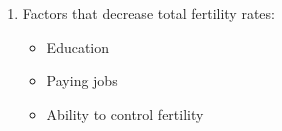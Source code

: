 \documentclass[12pt]{article}
\begin{document}
\begin{enumerate}
\begin{enumerate}
    \end{enumerate}

  \item Factors that decrease total fertility rates:

    \begin{itemize}

      \item Education

      \item Paying jobs

      \item Ability to control fertility

    \end{itemize}

\end{enumerate}
\end{document}
